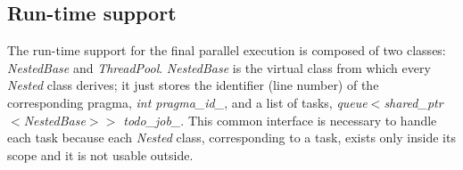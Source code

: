 \documentclass[a4paper,12pt,oneside]{book}
\begin{document}

\subsection{Run-time support}
\label{runtime}
The run-time support for the final parallel execution is composed of two classes: \emph{NestedBase} and \emph{ThreadPool}. \emph{NestedBase} is the virtual class from which every \emph{Nested} class derives; it just stores the identifier (line number) of the corresponding pragma, \emph{int pragma\_id\_}, and a list of tasks, \emph{queue$<$shared\_ptr$<$NestedBase$>>$ todo\_job\_}. This common interface is necessary to handle each task because each \emph{Nested} class, corresponding to a task, exists only inside its scope and it is not usable outside.   
\end{document}
